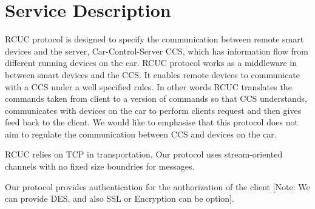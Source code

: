 \section{Service Description}
\label{sec:serv_desc}
\textsf{RCUC} protocol is designed to specify the communication between remote smart devices and the server, Car-Control-Server \textsf{CCS}, which has information flow from different running devices on the car. \textsf{RCUC} protocol works as a middleware in between smart devices and the \textsf{CCS}. It enables remote devices to communicate with a \textsf{CCS} under a well specified rules. In other words \textsf{RCUC} translates the commands taken from client to a version of commands so that \textsf{CCS} understands,  communicates with devices on the car to perform clients request and then gives feed back to the client.  We would like to emphasise that this protocol does not aim to regulate the communication between \textsf{CCS} and devices on the car.

\textsf{RCUC} relies on TCP in transportation. Our protocol uses stream-oriented channels with no fixed size boundries for messages.

Our protocol provides authentication for the authorization of the client [Note: We can provide DES, and also SSL or Encryption can be option].
